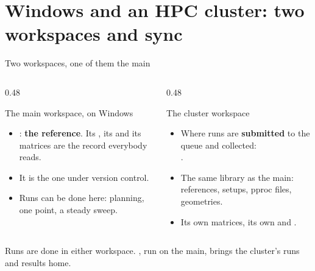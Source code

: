 %
%

\section{Windows and an HPC cluster: two workspaces and sync}
\label{sec:two-workspaces}

\begin{frame}{Two workspaces, one of them the main}
\begin{columns}[T]
\begin{column}{0.48\textwidth}
\begin{block}{The main workspace, on Windows}
\begin{itemize}\small
  \item {\scriptsize\code{\mainworkspace}}: \textbf{the reference}. Its ,
        its  and its matrices are the record everybody reads.
  \item It is the one under version control.
  \item Runs can be done here: planning, one point, a steady sweep.
\end{itemize}
\end{block}
\end{column}
\begin{column}{0.48\textwidth}
\begin{block}{The cluster workspace}
\begin{itemize}\small
  \item Where runs are \textbf{submitted} to the queue and collected:\\
        {\scriptsize\code{\clusterworkspace}}.
  \item The same  library as the main: references, setups,
        pproc files, geometries.
  \item Its own matrices, its own  and .
\end{itemize}
\end{block}
\end{column}
\end{columns}
\begin{takeaway}Runs are done in either workspace. , run
on the main, brings the cluster's runs and results home.\end{takeaway}
\end{frame}

